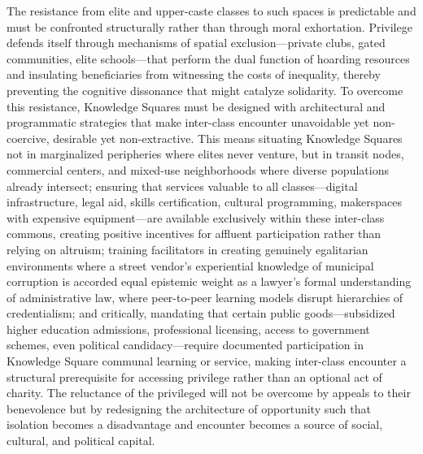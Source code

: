 The resistance from elite and upper-caste classes to such spaces is
predictable and must be confronted structurally rather than through
moral exhortation. Privilege defends itself through mechanisms of
spatial exclusion---private clubs, gated communities, elite
schools---that perform the dual function of hoarding resources and
insulating beneficiaries from witnessing the costs of inequality,
thereby preventing the cognitive dissonance that might catalyze
solidarity. To overcome this resistance, Knowledge Squares must be
designed with architectural and programmatic strategies that make
inter-class encounter unavoidable yet non-coercive, desirable yet
non-extractive. This means situating Knowledge Squares not in
marginalized peripheries where elites never venture, but in transit
nodes, commercial centers, and mixed-use neighborhoods where diverse
populations already intersect; ensuring that services valuable to all
classes---digital infrastructure, legal aid, skills certification,
cultural programming, makerspaces with expensive equipment---are
available exclusively within these inter-class commons, creating
positive incentives for affluent participation rather than relying on
altruism; training facilitators in creating genuinely egalitarian
environments where a street vendor's experiential knowledge of municipal
corruption is accorded equal epistemic weight as a lawyer's formal
understanding of administrative law, where peer-to-peer learning models
disrupt hierarchies of credentialism; and critically, mandating that
certain public goods---subsidized higher education admissions,
professional licensing, access to government schemes, even political
candidacy---require documented participation in Knowledge Square
communal learning or service, making inter-class encounter a structural
prerequisite for accessing privilege rather than an optional act of
charity. The reluctance of the privileged will not be overcome by
appeals to their benevolence but by redesigning the architecture of
opportunity such that isolation becomes a disadvantage and encounter
becomes a source of social, cultural, and political capital.

